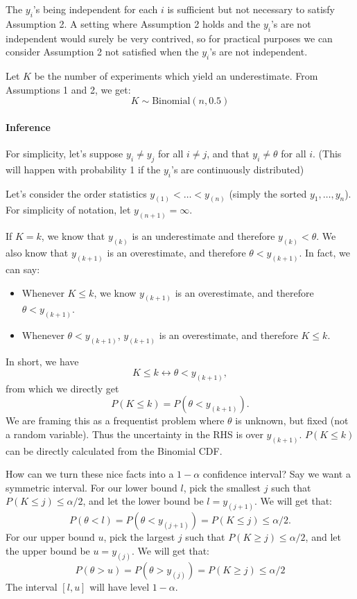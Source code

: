 \documentclass[letterpaper,12pt]{article}
\begin{document}
The $y_i$'s being independent for each $i$ is sufficient but not necessary to satisfy Assumption 2. A setting where Assumption 2 holds and the $y_i$'s are not independent would surely be very contrived, so for practical purposes we can consider Assumption 2 not satisfied when the $y_i$'s are not independent.

Let $K$ be the number of experiments which yield an underestimate. From Assumptions 1 and 2, we get:
\begin{equation*}K\sim\mathrm{Binomial}(n,0.5)\end{equation*}

\paragraph{Inference}\label{inference-3}

For simplicity, let's suppose $y_i\neq y_j$ for all $i\neq j$, and that $y_i\neq \theta$ for all $i$. (This will happen with probability 1 if the $y_i$'s are continuously distributed)

Let's consider the order statistics $y_{(1)}<\ldots< y_{(n)}$ (simply the sorted $y_1,\ldots,y_n$). For simplicity of notation, let $y_{(n+1)}=\infty$.

If $K=k$, we know that $y_{(k)}$ is an underestimate and therefore $y_{(k)}< \theta$. We also know that $y_{(k+1)}$ is an overestimate, and therefore $\theta < y_{(k+1)}$. In fact, we can say:

\begin{itemize}
\item
  Whenever $K\leq k$, we know $y_{(k+1)}$ is an overestimate, and therefore $\theta<y_{(k+1)}$.
\item
  Whenever $\theta<y_{(k+1)}$, $y_{(k+1)}$ is an overestimate, and therefore $K\leq k$.
\end{itemize}

In short, we have
\begin{equation*}K\leq k\leftrightarrow \theta< y_{(k+1)},\end{equation*}
from which we directly get
\begin{equation}\label{eq:st-prob}
  P(K\leq k)=P(\theta<y_{(k+1)}).
\end{equation}
We are framing this as a frequentist problem where $\theta$ is unknown, but fixed (not a random variable). Thus the uncertainty in the RHS is over $y_{(k+1)}$. $P(K\leq k)$ can be directly calculated from the Binomial CDF.

How can we turn these nice facts into a $1-\alpha$ confidence interval? Say we want a symmetric interval. For our lower bound $l$, pick the smallest $j$ such that $P(K\leq j)\leq \alpha/2$, and let the lower bound be $l=y_{(j+1)}$. We will get that:
\begin{equation*}P(\theta<l)=P(\theta<y_{(j+1)})=P(K\leq j)\leq \alpha/2 .\end{equation*}
For our upper bound $u$, pick the largest $j$ such that $P(K\geq j)\leq \alpha/2$, and let the upper bound be $u=y_{(j)}$. We
will get that:
\begin{equation*}P(\theta>u)=P(\theta>y_{(j)})=P(K\geq j)\leq \alpha/2\end{equation*}
The interval $[l,u]$ will have level $1-\alpha$.
\end{document}
